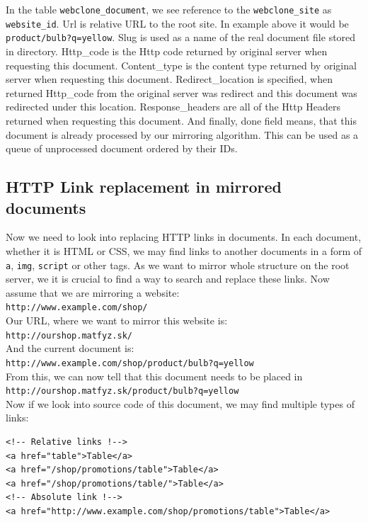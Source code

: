 In the table \texttt{webclone\_document}, we see reference to the \texttt{webclone\_site} as \texttt{website\_id}. Url is relative URL to the root site. In example above it would be \texttt{product/bulb?q=yellow}. Slug is used as a name of the real document file stored in directory. Http\_code is the Http code returned by original server when requesting this document. Content\_type is the content type returned by original server when requesting this document. Redirect\_location is specified, when returned Http\_code from the original server was redirect and this document was redirected under this location. Response\_headers are all of the Http Headers returned when requesting this document. And finally, done field means, that this document is already processed by our mirroring algorithm. This can be used as a queue of unprocessed document ordered by their IDs.

\subsection{HTTP Link replacement in mirrored documents}
\label{sec:linkReplace}
Now we need to look into replacing HTTP links in documents. In each document, whether it is HTML or CSS, we may find links to another documents in a form of \texttt{a}, \texttt{img}, \texttt{script} or other tags. As we want to mirror whole structure on the root server, we it is crucial to find a way to search and replace these links.
Now assume that we are mirroring a website: \\
\texttt{http://www.example.com/shop/} \\
Our URL, where  we want to mirror this website is: \\
\texttt{http://ourshop.matfyz.sk/} \\
And the current document is: \\
\texttt{http://www.example.com/shop/product/bulb?q=yellow} \\
From this, we can now tell that this document needs to be placed in \\
\texttt{http://ourshop.matfyz.sk/product/bulb?q=yellow} \\
Now if we look into source code of this document, we may find multiple types of links:

\begin{lstlisting}[caption={Multiple types of HTTP links},label={lst:multipleHrefs}]
<!-- Relative links !-->
<a href="table">Table</a>
<a href="/shop/promotions/table">Table</a>
<a href="/shop/promotions/table/">Table</a>
<!-- Absolute link !-->
<a href="http://www.example.com/shop/promotions/table">Table</a>
\end{lstlisting}

